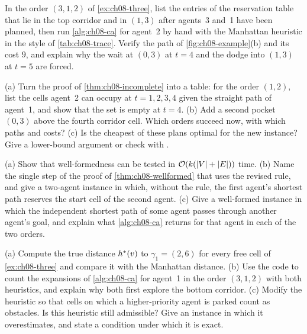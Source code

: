 \begin{exercise}
\label{exr:ch08-trace}
In the order $(3,1,2)$ of \cref{ex:ch08-three}, list the entries of the reservation
table that lie in the top corridor and in $(1,3)$ after agents~3 and~1 have been
planned, then run \cref{alg:ch08-ca} for agent~2 by hand with the Manhattan heuristic
in the style of \cref{tab:ch08-trace}. Verify the path of \cref{fig:ch08-example}(b) and
its cost $9$, and explain why the wait at $(0,3)$ at $t = 4$ and the dodge into
$(1,3)$ at $t = 5$ are forced.
\end{exercise}

\begin{exercise}
\label{exr:ch08-pocket}
(a) Turn the proof of \cref{thm:ch08-incomplete} into a table: for the order $(1,2)$,
list the cells agent~2 can occupy at $t = 1, 2, 3, 4$ given the straight path of
agent~1, and show that the set is empty at $t = 4$. (b) Add a second pocket $(0,3)$
above the fourth corridor cell. Which orders succeed now, with which paths and costs?
(c) Is the cheapest of these plans optimal for the new instance? Give a lower-bound
argument or check with .
\end{exercise}

\begin{exercise}
\label{exr:ch08-wellformed}
(a) Show that well-formedness can be tested in $\mathcal{O}\!\left(k(\left\lvert V \right\rvert + \left\lvert E \right\rvert)\right)$ time.
(b) Name the single step of the proof of \cref{thm:ch08-wellformed} that uses the
revised rule, and give a two-agent instance in which, without the rule, the first
agent's shortest path reserves the start cell of the second agent. (c) Give a
well-formed instance in which the independent shortest path of some agent passes
through another agent's goal, and explain what \cref{alg:ch08-ca} returns for that
agent in each of the two orders.
\end{exercise}

\begin{exercise}
\label{exr:ch08-hca}
(a) Compute the true distance $h^*(v)$ to $\gamma_1 = (2,6)$ for every free cell of
\cref{ex:ch08-three} and compare it with the Manhattan distance. (b) Use the code to
count the expansions of \cref{alg:ch08-ca} for agent~1 in the order $(3,1,2)$ with both
heuristics, and explain why both first explore the bottom corridor. (c) Modify the
heuristic so that cells on which a higher-priority agent is parked count as obstacles.
Is this heuristic still admissible? Give an instance in which it overestimates, and
state a condition under which it is exact.
\end{exercise}

